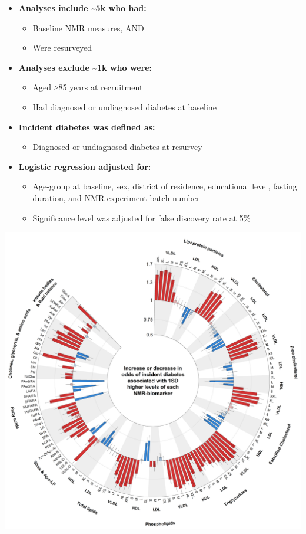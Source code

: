 \documentclass[
]{article}
\providecommand{\tightlist}{%
  \setlength{\itemsep}{0pt}\setlength{\parskip}{0pt}}
\begin{document}
\begin{itemize}
\tightlist
\item
  \textbf{Analyses include \textasciitilde5k who had:}

  \begin{itemize}
  \tightlist
  \item
    Baseline NMR measures, AND\\
  \item
    Were resurveyed
  \end{itemize}
\item
  \textbf{Analyses exclude \textasciitilde1k who were:}

  \begin{itemize}
  \tightlist
  \item
    Aged ≥85 years at recruitment\\
  \item
    Had diagnosed or undiagnosed diabetes at baseline
  \end{itemize}
\item
  \textbf{Incident diabetes was defined as:}

  \begin{itemize}
  \tightlist
  \item
    Diagnosed or undiagnosed diabetes at resurvey
  \end{itemize}
\item
  \textbf{Logistic regression adjusted for:}

  \begin{itemize}
  \tightlist
  \item
    Age-group at baseline, sex, district of residence, educational
    level, fasting duration, and NMR experiment batch number
  \item
    Significance level was adjusted for false discovery rate at 5\%
  \end{itemize}
\end{itemize}

\includegraphics{foo.png}
\end{document}

